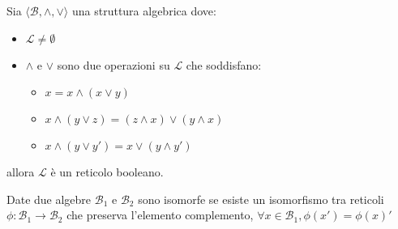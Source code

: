 \begin{definizione}
    Sia $\langle \mathcal{B}, \land,\lor\rangle$ una struttura algebrica dove:
    \begin{itemize}
        \item $\mathcal{L}\ne \emptyset$
        \item $\land$ e $\lor$ sono due operazioni su  $\mathcal{L}$ che soddisfano:
        \begin{itemize}
            \item $x= x\land (x\lor y)$
            \item $x\land (y\lor z) = (z\land x) \lor (y\land x)$
            \item $x\land(y\lor y') = x\lor(y\land y')$
        \end{itemize}
    \end{itemize}
    allora $\mathcal{L}$ è un reticolo booleano.
\end{definizione}


\begin{definizione}
    Date due algebre $\mathcal{B}_1$ e $\mathcal{B}_2$ sono isomorfe se esiste un
    isomorfismo tra reticoli $\phi:\mathcal{B}_1\to \mathcal{B}_2$ che preserva 
    l'elemento complemento, $\forall x\in \mathcal{B}_1, \phi(x') = \phi(x)'$
\end{definizione}

